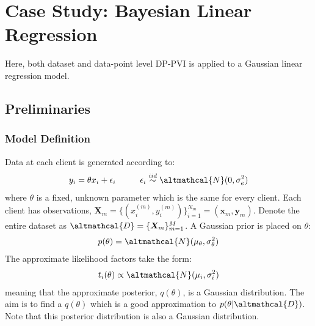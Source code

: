 
\chapter{Case Study: Bayesian Linear Regression}
%
\graphicspath{{Results/Figs}}

Here, both dataset and data-point level DP-PVI is applied to a Gaussian linear regression model. 
\section{Preliminaries}
\subsection{Model Definition}
Data at each client is generated according to:
\begin{align}
y_i = \theta x_i + \epsilon_i \hspace{1cm} \epsilon_i \stackrel{iid}{\sim} \altmathcal{N}(0, \sigma_e^2)
\end{align}
where $\theta$ is a fixed, unknown parameter which is the same for every client. Each client has observations, $\bm{X}_m = \lbrace (x_i^{(m)}, y_i^{(m)}) \rbrace_{i=1}^{N_m} = (\bm{x}_m, \bm{y}_m)$. Denote the entire dataset as $\altmathcal{D} = \lbrace \bm{X}_m \rbrace_{m=1}^{M}$. A Gaussian prior is placed on $\theta$:
\begin{align}
p(\theta) = \altmathcal{N}(\mu_\theta, \sigma_\theta^2)
\end{align}
The approximate likelihood factors take the form:
\begin{align}
	t_i(\theta) \propto  \altmathcal{N}(\mu_i, \sigma_i^2)
\end{align}
meaning that the approximate posterior, $q(\theta)$, is a Gaussian distribution. The aim is to find a $q(\theta)$ which is a good approximation to $p(\theta | \altmathcal{D})$. Note that this posterior distribution is also a Gaussian distribution.

